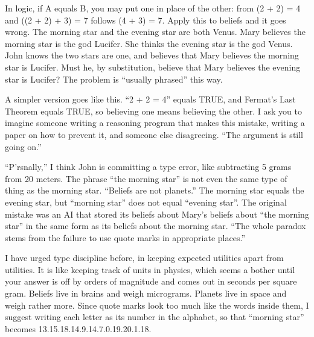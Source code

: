 
In logic, if A equals B, you may put one in place of the other: from (2 + 2) = 4 and ((2 + 2) + 3) = 7 follows (4 + 3) = 7. Apply this to beliefs and it goes wrong. The morning star and the evening star are both Venus. Mary believes the morning star is the god Lucifer. She thinks the evening star is the god Venus. John knows the two stars are one, and believes that Mary believes the morning star is Lucifer. Must he, by substitution, believe that Mary believes the evening star is Lucifer? The problem is ``usually phrased'' this way. 

A simpler version goes like this. ``2 + 2 = 4'' equals TRUE, and Fermat's Last Theorem equals TRUE, so believing one means believing the other. I ask you to imagine someone writing a reasoning program that makes this mistake, writing a paper on how to prevent it, and someone else disagreeing. ``The argument is still going on.'' 

``P'rsnally,'' I think John is committing a type error, like subtracting 5 grams from 20 meters. The phrase ``the morning star'' is not even the same type of thing as the morning star. ``Beliefs are not planets.'' The morning star equals the evening star, but ``morning star'' does not equal ``evening star''. The original mistake was an AI that stored its beliefs about Mary's beliefs about ``the morning star'' in the same form as its beliefs about the morning star. ``The whole paradox stems from the failure to use quote marks in appropriate places.'' 

I have urged type discipline before, in keeping expected utilities apart from utilities. It is like keeping track of units in physics, which seems a bother until your answer is off by orders of magnitude and comes out in seconds per square gram. Beliefs live in brains and weigh micrograms. Planets live in space and weigh rather more. Since quote marks look too much like the words inside them, I suggest writing each letter as its number in the alphabet, so that ``morning star'' becomes 13.15.18.14.9.14.7.0.19.20.1.18.


